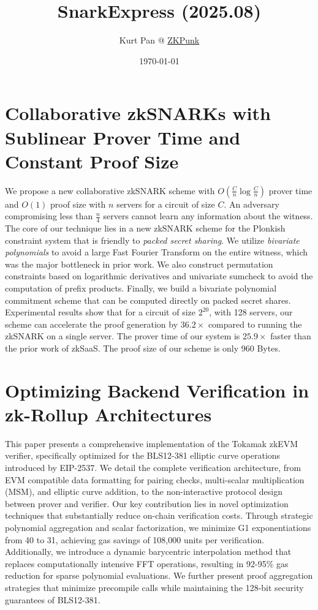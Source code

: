 \documentclass[11pt]{article}
\theoremstyle{definition}
\theoremstyle{remark}
\theoremstyle{plain}
\begin{document}
\title{SnarkExpress (2025.08)}
\author{Kurt Pan @ \href{https://zkpunk.pro}{ZKPunk}}
\date{\today}
\maketitle
\tableofcontents

\section{\cite{cryptoeprint:2025/1388} Collaborative zkSNARKs with Sublinear Prover Time and Constant Proof Size}
We propose a new collaborative zkSNARK scheme with $O\left(\frac{C}{n} \log \frac{C}{n}\right)$ prover time and $O(1)$ proof size with $n$ servers for a circuit of size $C$. 
An adversary compromising less than $\frac{n}{4}$ servers cannot learn any information about the witness. 
The core of our technique lies in a new zkSNARK scheme for the Plonkish constraint system that is friendly to \emph{packed secret sharing}. We utilize \emph{bivariate polynomials} to avoid a large Fast Fourier Transform on the entire witness, which was the major bottleneck in prior work. We also construct permutation constraints based on logarithmic derivatives and univariate sumcheck to avoid the computation of prefix products. Finally, we build a bivariate polynomial commitment scheme that can be computed directly on packed secret shares.
Experimental results show that for a circuit of size $2^{20}$, with 128 servers, our scheme can accelerate the proof generation by $36.2 \times$ compared to running the zkSNARK on a single server. The prover time of our system is $25.9 \times$ faster than the prior work of zkSaaS. The proof size of our scheme is only 960 Bytes.

\section{\cite{cryptoeprint:2025/1390} Optimizing Backend Verification in zk-Rollup Architectures}
This paper presents a comprehensive implementation of the Tokamak zkEVM verifier, specifically optimized for the BLS12-381 elliptic curve operations introduced by EIP-2537. We detail the complete verification architecture, from EVM compatible data formatting for pairing checks, multi-scalar multiplication (MSM), and elliptic curve addition, to the non-interactive protocol design between prover and verifier.
Our key contribution lies in novel optimization techniques that substantially reduce on-chain verification costs. 
Through strategic polynomial aggregation and scalar factorization, we minimize G1 exponentiations from 40 to 31, achieving gas savings of 108,000 units per verification. 
Additionally, we introduce a dynamic barycentric interpolation method that replaces computationally intensive FFT operations,
resulting in 92-95\% gas reduction for sparse polynomial evaluations. We further present proof aggregation strategies that minimize precompile calls while maintaining the 128-bit security guarantees of BLS12-381.
\end{document}
